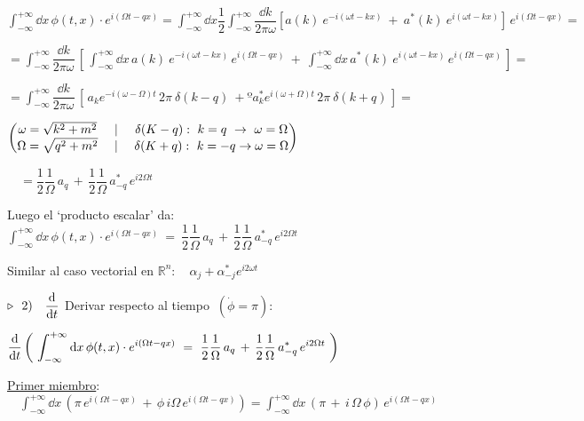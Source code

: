 $\displaystyle \int_{-\infty}^{+\infty} \dd x \, \phi(t,x) \cdot e^{i(\Omega t-qx)} =  \int_{-\infty}^{+\infty} \dd x  \dfrac 1 2   \int_{-\infty}^{+\infty} 
\dfrac{\dd k}{2\pi \omega}  \left[  
 a(k)\ e^{-i(\omega t-kx)} \ + \ a^*(k)\ e^{i(\omega t-kx)}  \right] \, e^{i(\Omega t-qx)}  =$

$=\displaystyle \int_{-\infty}^{+\infty}  \dfrac{\dd k}{2\pi \omega} \,
\left[ \,  
\int_{-\infty}^{+\infty} \dd x\, a(k)\ e^{-i(\omega t-kx)} \, e^{i(\Omega t-qx)}
\ + \   
\int_{-\infty}^{+\infty} \dd x\, a^*(k)\ e^{i(\omega t-kx)}  \, e^{i(\Omega t-qx)}
\, \right]=$

$\displaystyle = \int_{-\infty}^{+\infty}  \dfrac{\dd k}{2\pi \omega} \,
\left[ \, 
a_k e^{-i(\omega-\Omega)t}\, 2\pi\ \delta(k-q) \ + º a^*_k e^{i(\omega+\Omega)t}\, 2\pi \ \delta(k+q)
\, \right]= \ $

\begin{tiny} \textcolor{gris}{$\mqty( \omega=\sqrt{k^2+m^2} & \ | \ & \delta(K-q):\ k=q \  \to \ \omega=\Omega \\ \Omega=\sqrt{q^2+m^2} & \ | \ & \delta(K+q):\ k=-q \to \omega=\Omega)$} \end{tiny}
$\quad =\dfrac 1 2 \dfrac 1 \Omega \, a_q \, + \, \dfrac 1 2 \dfrac 1 \Omega \, a^*_{-q}\, e^{i2\Omega t}$

Luego el `producto escalar' da: $\displaystyle \int_{-\infty}^{+\infty} \dd x \, \phi(t,x) \cdot e^{i(\Omega t-qx)} \ = \  \dfrac 1 2 \dfrac 1 \Omega \, a_q \, + \, \dfrac 1 2 \dfrac 1 \Omega \, a^*_{-q}\, e^{i2\Omega t} $

\begin{footnotesize}\textcolor{gris}{
Similar al caso vectorial en $\mathbb R^n:\quad \alpha_j+\alpha^*_{-j}e^{i2\omega t}$	}
\end{footnotesize}


\vspace{5mm} $\triangleright \ \ 2) \quad \displaystyle \dv{t} $ Derivar respecto al tiempo $\ (\dot \phi = \pi)$:

$\displaystyle \dv{t} \left( \  \int_{-\infty}^{+\infty} \dd x \, \phi(t,x) \cdot e^{i(\Omega t-qx)} \ = \  \dfrac 1 2 \dfrac 1 \Omega \, a_q \, + \, \dfrac 1 2 \dfrac 1 \Omega \, a^*_{-q}\, e^{i2\Omega t} \ \right )$

\underline{Primer miembro}: $\quad \displaystyle  \int_{-\infty}^{+\infty} \dd x \,  \left(  \pi\, e^{i(\Omega t-qx)} \, + \, \phi\, i\Omega\,  e^{i(\Omega t-qx)} \right) =  \int_{-\infty}^{+\infty} \dd x \, (\pi\, + \, i\, \Omega\, \phi) \,  e^{i(\Omega t-qx)} $

